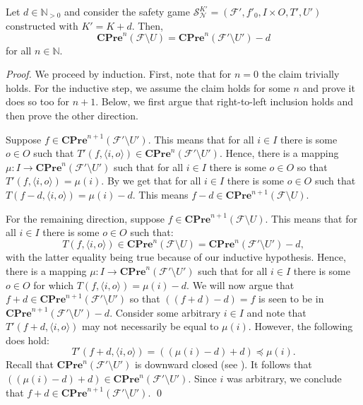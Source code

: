\documentclass[runningheads,a4paper,draft]{llncs}
\newcommand{\cpre}{\mathbf{CPre}}
\newcommand{\calF}{\mathcal{F}}
\newcommand{\calN}{\mathcal{N}}
\newcommand{\calS}{\mathcal{S}}
\begin{document}
\begin{lemma}\label{lem:eq-games}
  Let $d \in \mathbb{N}_{>0}$ and consider the safety game $\calS^{K'}_\calN =
  (\calF',f'_0,I \times O,T',U')$ constructed with $K' = K + d$. Then,
  \[\cpre^n(\calF \setminus U) = \cpre^n(\calF'\setminus U') - d\] for all $n \in
  \mathbb{N}$.
\end{lemma}
\begin{proof}
  We proceed by induction. First, note that for $n = 0$ the claim trivially
  holds. For the inductive step, we assume the claim holds for some $n$ and
  prove it does so too for $n + 1$. 
  Below, we first argue that right-to-left inclusion holds and then
  prove the other direction.

  Suppose $f \in \cpre^{n+1}(\calF'\setminus U')$. This means that for all $i \in I$
  there is some $o \in O$ such that $T'(f,\langle i , o \rangle) \in
  \cpre^{n}(\calF' \setminus U')$. Hence, there is a mapping $\mu : I \to
  \cpre^n(\calF' \setminus U')$ such that for all $i \in I$ there is some $o \in
  O$ so that $T'(f,\langle i , o \rangle) = \mu(i)$. By
    we get that for all $i \in I$
  there is some $o \in O$ such that $T(f - d, \langle i, o \rangle) = \mu(i) -
  d$. This means $f - d \in \cpre^{n+1}(\calF\setminus U)$.

  For the remaining direction, suppose $f \in \cpre^{n+1}(\calF \setminus U)$.
  This means that for all $i \in I$ there is some $o \in O$ such that:
  \[
    T(f, \langle i , o \rangle) \in \cpre^n(\calF \setminus U) =
    \cpre^n(\calF'\setminus U') -d,
  \]
  with the latter equality being true because of our inductive hypothesis.
  Hence, there is a mapping $\mu : I \to \cpre^n(\calF' \setminus U')$ such that
  for all $i \in I$ there is some $o \in O$ for which $T(f, \langle i, o
  \rangle) = \mu(i) - d$. We will now argue that $f + d \in \cpre^{n+1}(\calF'
  \setminus U')$ so that $((f+d)-d) = f$ is seen to be in $\cpre^{n+1}(\calF'
  \setminus U') - d$. Consider some arbitrary $i \in I$ and 
  note that $T'(f + d, \langle i , o \rangle)$ may not
  necessarily be equal to $\mu(i)$. However, the following does hold:
  \[
    T'(f+d, \langle i , o \rangle) = ((\mu(i) -d) + d) \preceq \mu(i).
  \]
  Recall that $\cpre^n(\calF' \setminus U')$ is downward closed (see
  ). It follows that $((\mu(i) -d ) + d) \in
  \cpre^n(\calF'
  \setminus U')$. Since $i$ was arbitrary, we conclude that $f + d \in
  \cpre^{n+1}(\calF' \setminus U')$. \qed
\end{proof}
\end{document}

